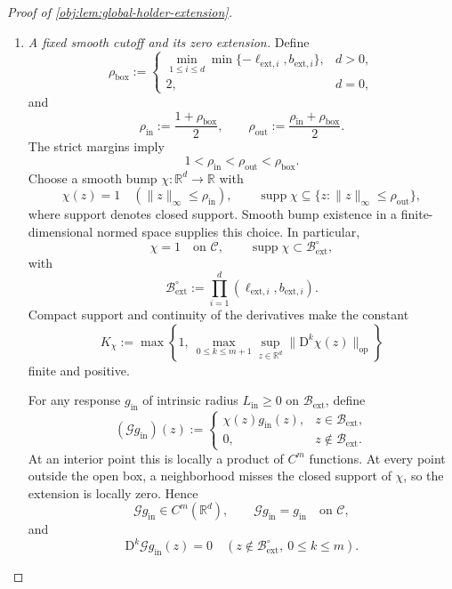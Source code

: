 \begin{proof}[Proof of \cref{obj:lem:global-holder-extension}]
\begin{enumerate}
\item\label{proof:global-holder-extension:cutoff} \emph{A fixed smooth cutoff and its zero extension.}
Define
\[
\rho_{\mathrm{box}}:=
\begin{cases}
\displaystyle\min_{1\le i\le d}
\min\{-\ell_{\mathrm{ext},i},b_{\mathrm{ext},i}\},&d>0,\\
2,&d=0,
\end{cases}
\]
and
\[
\rho_{\mathrm{in}}:=\frac{1+\rho_{\mathrm{box}}}{2},
\qquad
\rho_{\mathrm{out}}:=\frac{\rho_{\mathrm{in}}+\rho_{\mathrm{box}}}{2}.
\]
The strict margins imply
\[
1<\rho_{\mathrm{in}}<\rho_{\mathrm{out}}<\rho_{\mathrm{box}}.
\]
Choose a smooth bump \(\chi:\mathbb R^d\to\mathbb R\) with
\[
\chi(z)=1\quad(\|z\|_\infty\le\rho_{\mathrm{in}}),
\qquad
\operatorname{supp}\chi
\subseteq\{z:\|z\|_\infty\le\rho_{\mathrm{out}}\},
\]
where support denotes closed support. Smooth bump existence in a finite-dimensional normed space supplies this choice. In particular,
\[
\chi=1\quad\text{on }\mathcal C,
\qquad
\operatorname{supp}\chi\subset
\mathcal B_{\mathrm{ext}}^\circ,
\]
with
\[
\mathcal B_{\mathrm{ext}}^\circ
:=\prod_{i=1}^d
(\ell_{\mathrm{ext},i},b_{\mathrm{ext},i}).
\]
Compact support and continuity of the derivatives make the constant
\[
K_\chi:=
\max\left\{
1,\ 
\max_{0\le k\le m+1}
\sup_{z\in\mathbb R^d}
\|\mathrm D^k\chi(z)\|_{\mathrm{op}}
\right\}
\]
finite and positive.

For any response \(g_{\mathrm{in}}\) of intrinsic radius \(L_{\mathrm{in}}\ge0\) on \(\mathcal B_{\mathrm{ext}}\), define
\[
(\mathscr G g_{\mathrm{in}})(z)
:=
\begin{cases}
\chi(z)g_{\mathrm{in}}(z),&z\in\mathcal B_{\mathrm{ext}},\\
0,&z\notin\mathcal B_{\mathrm{ext}}.
\end{cases}
\]
At an interior point this is locally a product of \(C^m\) functions. At every point outside the open box, a neighborhood misses the closed support of \(\chi\), so the extension is locally zero. Hence
\[
\mathscr G g_{\mathrm{in}}\in C^m(\mathbb R^d),
\qquad
\mathscr G g_{\mathrm{in}}=g_{\mathrm{in}}\quad\text{on }\mathcal C,
\]
and
\[
\mathrm D^k\mathscr G g_{\mathrm{in}}(z)=0
\quad(z\notin\mathcal B_{\mathrm{ext}}^\circ,\ 0\le k\le m).
\]


\end{enumerate}
\end{proof}
